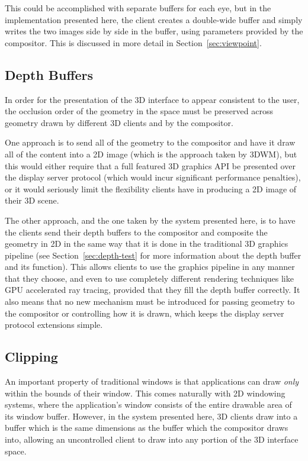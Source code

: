 This could be accomplished with separate buffers for each eye, but in the implementation presented here, the client creates a double-wide buffer and simply writes the two images side by side in the buffer, using parameters provided by the compositor. This is discussed in more detail in Section~\ref{sec:viewpoint}.

\subsection{Depth Buffers}
\label{sec:depth-compositing}

In order for the presentation of the 3D interface to appear consistent to the user, the occlusion order of the geometry in the space must be preserved across geometry drawn by different 3D clients and by the compositor. 

One approach is to send all of the geometry to the compositor and have it draw all of the content into a 2D image (which is the approach taken by 3DWM), but this would either require that a full featured 3D graphics API be presented over the display server protocol (which would incur significant performance penalties), or it would seriously limit the flexibility clients have in producing a 2D image of their 3D scene.

The other approach, and the one taken by the system presented here, is to have the clients send their depth buffers to the compositor and composite the geometry in 2D in the same way that it is done in the traditional 3D graphics pipeline (see Section~\ref{sec:depth-test} for more information about the depth buffer and its function). This allows clients to use the graphics pipeline in any manner that they choose, and even to use completely different rendering techniques like GPU accelerated ray tracing, provided that they fill the depth buffer correctly. It also means that no new mechanism must be introduced for passing geometry to the compositor or controlling how it is drawn, which keeps the display server protocol extensions simple.

\subsection{Clipping}
\label{sec:clipping}

An important property of traditional windows is that applications can draw \textit{only} within the bounds of their window. This comes naturally with 2D windowing systems, where the application's window consists of the entire drawable area of its window buffer. However, in the system presented here, 3D clients draw into a buffer which is the same dimensions as the buffer which the compositor draws into, allowing an uncontrolled client to draw into any portion of the 3D interface space.

